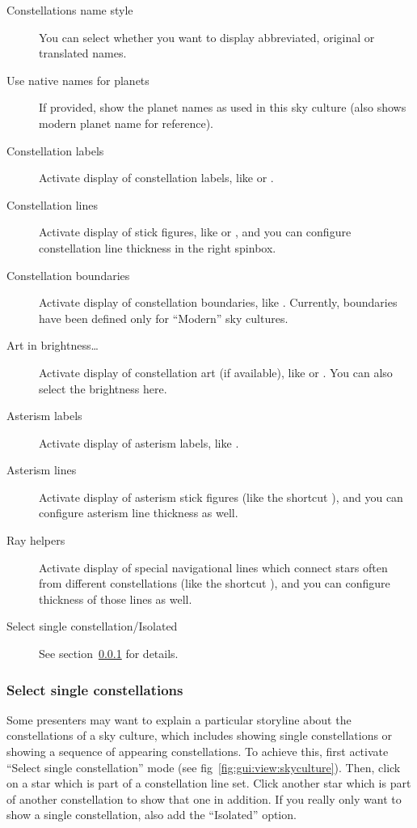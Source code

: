 \begin{description}
\item[Constellations name style]  You can
  select whether you want to display abbreviated, original or
  translated names.
\item[Use native names for planets] If provided, show the planet names
  as used in this sky culture (also shows modern planet name for
  reference). %
\item[Constellation labels] Activate display of constellation labels, like
   or . 
\item[Constellation lines] Activate display of stick
  figures, like  or , and you
  can configure constellation line thickness in the right spinbox.
\item[Constellation boundaries] Activate display of constellation boundaries,
  like . Currently, boundaries have been defined only for
  ``Modern'' sky cultures.
\item[Art in brightness\ldots] Activate display of constellation
  art (if available), like  or
  . You can also select the brightness here.
\item[Asterism labels] Activate display of asterism labels, like .
\item[Asterism lines] Activate display of asterism stick figures   
  (like the shortcut ), and you can configure asterism line thickness as well.
\item[Ray helpers] Activate display of special navigational lines which 
  connect stars often from different constellations (like the shortcut ),
  and you can configure thickness of those lines as well.
\item[Select single constellation/Isolated] See section~\ref{sec:skyculture:singleConstellations} for details.
\end{description}



\subsubsection{Select single constellations}
\label{sec:skyculture:singleConstellations}

Some presenters may want to explain a particular storyline about the
constellations of a sky culture, which includes showing single
constellations or showing a sequence of appearing constellations. To
achieve this, first activate ``Select single constellation'' mode (see
fig~\ref{fig:gui:view:skyculture}).  Then, click on a star
which is part of a constellation line set. Click
another star which is part of another constellation to show that one in addition.
If you really only want to show a single constellation, also add the ``Isolated'' option.

